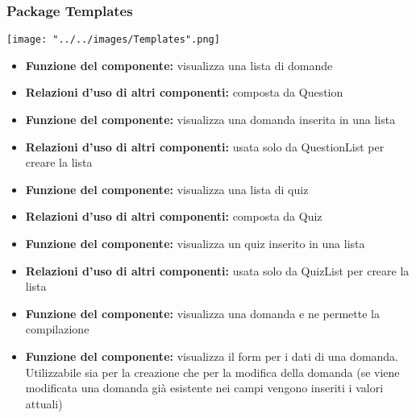 	\subsubsection{Package Templates}
		\begin{center}
			\texttt{[image: "../../images/Templates".png]}
		\end{center}
			\begin{itemize}
				\item\textbf{Funzione del componente:} visualizza una lista di domande
				\item\textbf{Relazioni d'uso di altri componenti:} composta da Question
			\end{itemize}
			\begin{itemize}
				\item\textbf{Funzione del componente:} visualizza una domanda inserita in una lista
				\item\textbf{Relazioni d'uso di altri componenti:} usata solo da QuestionList per creare la lista
			\end{itemize}
			\begin{itemize}
				\item\textbf{Funzione del componente:} visualizza una lista di quiz
				\item\textbf{Relazioni d'uso di altri componenti:} composta da Quiz
			\end{itemize}
			\begin{itemize}
				\item\textbf{Funzione del componente:} visualizza un quiz inserito in una lista
				\item\textbf{Relazioni d'uso di altri componenti:} usata solo da QuizList per creare la lista
			\end{itemize}
			\begin{itemize}
				\item\textbf{Funzione del componente:} visualizza una domanda e ne permette la compilazione
			\end{itemize}
			\begin{itemize}
				\item\textbf{Funzione del componente:} visualizza il form per i dati di una domanda. Utilizzabile sia per la creazione che per la modifica della domanda (se viene modificata una domanda già esistente nei campi vengono inseriti i valori attuali)
			\end{itemize}
